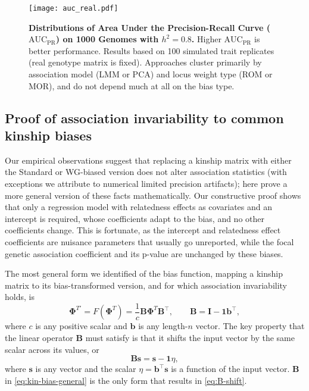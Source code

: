 \documentclass[9pt,twocolumn,twoside]{gsajnl}
\newcommand{\kinMat}[1][T]{\mathbf{\Phi}^{#1}}
\newcommand{\kinMatPrime}{\mathbf{\Phi}^{T\prime}}
\newcommand{\auc}{\text{AUC}_\text{PR}}
\begin{document}
\begin{figure}[tb]
  \centering
  \texttt{[image: auc\_real.pdf]}
  \caption{
    {\bf Distributions of Area Under the Precision-Recall Curve ($\auc$) on 1000 Genomes with $h^2=0.8$.}
    Higher $\auc$ is better performance.
    Results based on 100 simulated trait replicates (real genotype matrix is fixed).
    Approaches cluster primarily by association model (LMM or PCA) and locus weight type (ROM or MOR), and do not depend much at all on the bias type.
  }
  \label{fig:auc_real}
\end{figure}

\subsection{Proof of association invariability to common kinship biases}

Our empirical observations suggest that replacing a kinship matrix with either the Standard or WG-biased version does not alter association statistics (with exceptions we attribute to numerical limited precision artifacts); here prove a more general version of these facts mathematically.
Our constructive proof shows that only a regression model with relatedness effects as covariates and an intercept is required, whose coefficients adapt to the bias, and no other coefficients change.
This is fortunate, as the intercept and relatedness effect coefficients are nuisance parameters that usually go unreported, while the focal genetic association coefficient and its p-value are unchanged by these biases.

The most general form we identified of the bias function, mapping a kinship matrix to its bias-transformed version, and for which association invariability holds, is
\begin{equation}
  \label{eq:kin-bias-general}
  \kinMatPrime
  =
  F \left( \kinMat \right)
  =
  \frac{1}{c}
  \mathbf{B} \kinMat \mathbf{B}^\intercal
  , \quad\quad
  \mathbf{B}
  =
  \mathbf{I} - \mathbf{1} \mathbf{b}^\intercal
  ,
\end{equation}
where $c$ is any positive scalar and $\mathbf{b}$ is any length-$n$ vector.
The key property that the linear operator $\mathbf{B}$ must satisfy is that it shifts the input vector by the same scalar across its values, or
\begin{equation}
  \label{eq:B-shift}
  \mathbf{B} \mathbf{s}
  =
  \mathbf{s} - \mathbf{1} \eta
  ,
\end{equation}
where $\mathbf{s}$ is any vector and the scalar $\eta = \mathbf{b}^\intercal \mathbf{s}$ is a function of the input vector.
$\mathbf{B}$ in \cref{eq:kin-bias-general} is the only form that results in \cref{eq:B-shift}.
\end{document}
